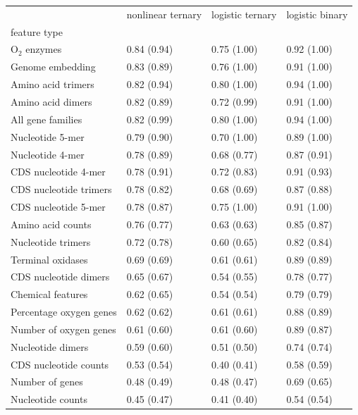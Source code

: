 \begin{tabular}{llll}
\toprule
 & nonlinear ternary & logistic ternary & logistic binary \\
feature type &  &  &  \\
\midrule
O$_2$ enzymes & 0.84 (0.94) & 0.75 (1.00) & 0.92 (1.00) \\
Genome embedding & 0.83 (0.89) & 0.76 (1.00) & 0.91 (1.00) \\
Amino acid trimers & 0.82 (0.94) & 0.80 (1.00) & 0.94 (1.00) \\
Amino acid dimers & 0.82 (0.89) & 0.72 (0.99) & 0.91 (1.00) \\
All gene families & 0.82 (0.99) & 0.80 (1.00) & 0.94 (1.00) \\
Nucleotide 5-mer & 0.79 (0.90) & 0.70 (1.00) & 0.89 (1.00) \\
Nucleotide 4-mer & 0.78 (0.89) & 0.68 (0.77) & 0.87 (0.91) \\
CDS nucleotide 4-mer & 0.78 (0.91) & 0.72 (0.83) & 0.91 (0.93) \\
CDS nucleotide trimers & 0.78 (0.82) & 0.68 (0.69) & 0.87 (0.88) \\
CDS nucleotide 5-mer & 0.78 (0.87) & 0.75 (1.00) & 0.91 (1.00) \\
Amino acid counts & 0.76 (0.77) & 0.63 (0.63) & 0.85 (0.87) \\
Nucleotide trimers & 0.72 (0.78) & 0.60 (0.65) & 0.82 (0.84) \\
Terminal oxidases & 0.69 (0.69) & 0.61 (0.61) & 0.89 (0.89) \\
CDS nucleotide dimers & 0.65 (0.67) & 0.54 (0.55) & 0.78 (0.77) \\
Chemical features & 0.62 (0.65) & 0.54 (0.54) & 0.79 (0.79) \\
Percentage oxygen genes & 0.62 (0.62) & 0.61 (0.61) & 0.88 (0.89) \\
Number of oxygen genes & 0.61 (0.60) & 0.61 (0.60) & 0.89 (0.87) \\
Nucleotide dimers & 0.59 (0.60) & 0.51 (0.50) & 0.74 (0.74) \\
CDS nucleotide counts & 0.53 (0.54) & 0.40 (0.41) & 0.58 (0.59) \\
Number of genes & 0.48 (0.49) & 0.48 (0.47) & 0.69 (0.65) \\
Nucleotide counts & 0.45 (0.47) & 0.41 (0.40) & 0.54 (0.54) \\
\bottomrule
\end{tabular}
